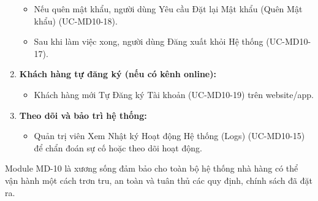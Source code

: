 \begin{enumerate}
\begin{itemize}
            \item Nếu quên mật khẩu, người dùng Yêu cầu Đặt lại Mật khẩu (Quên Mật khẩu) (UC-MD10-18).
            \item Sau khi làm việc xong, người dùng Đăng xuất khỏi Hệ thống (UC-MD10-17).
        \end{itemize}
    \item \textbf{Khách hàng tự đăng ký (nếu có kênh online):}
        \begin{itemize}
            \item Khách hàng mới Tự Đăng ký Tài khoản (UC-MD10-19) trên website/app.
        \end{itemize}
    \item \textbf{Theo dõi và bảo trì hệ thống:}
        \begin{itemize}
            \item Quản trị viên Xem Nhật ký Hoạt động Hệ thống (Logs) (UC-MD10-15) để chẩn đoán sự cố hoặc theo dõi hoạt động.
        \end{itemize}
\end{enumerate}
Module MD-10 là xương sống đảm bảo cho toàn bộ hệ thống nhà hàng có thể vận hành một cách trơn tru, an toàn và tuân thủ các quy định, chính sách đã đặt ra.

